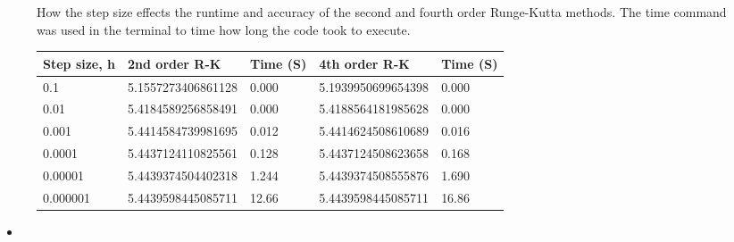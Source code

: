 \documentclass[a4paper, oneside 12pt]{article}
\begin{document}
\begin{addmargin}[-3em]{-3em}
 \begin{figure} [!ht]
 	\centering
 		 {How the step size effects the runtime and accuracy of the second and fourth order Runge-Kutta methods. The time command was used in the terminal to time how long the code took to execute. } \label{tab:title}
 		\begin{tabular}{| l | l | l | l | l |}
 			\hline
 			Step size, h & 2nd order R-K & Time (S) & 4th order R-K & Time (S) \\ \hline
 			0.1 & 5.1557273406861128  & 0.000 & 5.1939950699654398 & 0.000 \\ \hline
 			0.01 & 5.4184589256858491  & 0.000 & 5.4188564181985628 & 0.000 \\ \hline
 			0.001 & 5.4414584739981695  & 0.012 & 5.4414624508610689 & 0.016 \\ \hline
 			0.0001 & 5.4437124110825561  & 0.128 & 5.4437124508623658 & 0.168 \\ \hline
 			0.00001 & 5.4439374504402318  & 1.244 & 5.4439374508555876 & 1.690 \\ \hline
 			0.000001 & 5.4439598445085711  & 12.66 & 5.4439598445085711 & 16.86 \\ \hline
 		\end{tabular}
 		\bigskip 
 \end{figure}


\begin{itemize}
	\item 

\end{itemize}




\end{addmargin}
\end{document}
